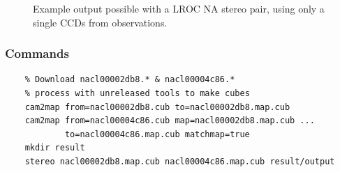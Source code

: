 \begin{figure}[h!]
\centering
  \hfil
\caption{Example output possible with a LROC NA stereo pair, using only a single CCDs from observations.}
\label{fig:lroc-na-example}
\end{figure}

\subsubsection*{Commands}

\begin{verbatim}
    % Download nacl00002db8.* & nacl00004c86.*
    % process with unreleased tools to make cubes
    cam2map from=nacl00002db8.cub to=nacl00002db8.map.cub
    cam2map from=nacl00004c86.cub map=nacl00002db8.map.cub ...
            to=nacl00004c86.map.cub matchmap=true
    mkdir result
    stereo nacl00002db8.map.cub nacl00004c86.map.cub result/output
\end{verbatim}

